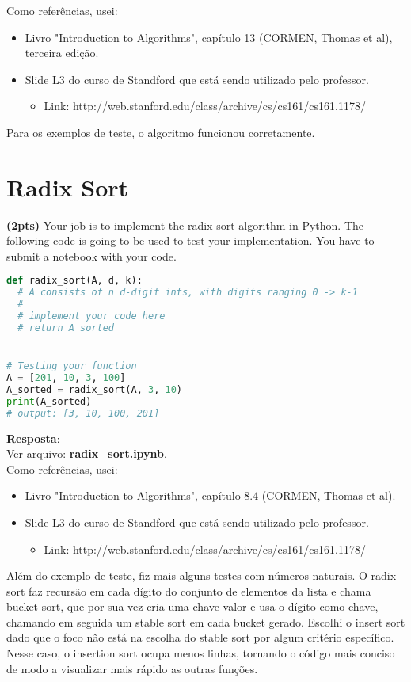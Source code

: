 \documentclass{article}
\begin{document}
Como referências, usei:
\begin{itemize}
	\item Livro "Introduction to Algorithms", capítulo 13 (CORMEN, Thomas et al), terceira edição.
	\item Slide L3 do curso de Standford que está sendo utilizado pelo professor. 
	\begin{itemize}
		\item Link: http://web.stanford.edu/class/archive/cs/cs161/cs161.1178/
	\end{itemize}
\end{itemize}

Para os exemplos de teste, o algoritmo funcionou corretamente.

\section{Radix Sort}

\textbf{(2pts) }Your job is to implement the radix sort algorithm in Python. The following code is going to be used to test your implementation. You have to submit a notebook with your code. 
  
\begin{lstlisting}[language=Python]
def radix_sort(A, d, k):
  # A consists of n d-digit ints, with digits ranging 0 -> k-1
  #
  # implement your code here
  # return A_sorted


# Testing your function
A = [201, 10, 3, 100]
A_sorted = radix_sort(A, 3, 10)
print(A_sorted)
# output: [3, 10, 100, 201]
\end{lstlisting}

\textbf{Resposta}:\\

Ver arquivo: \textbf{radix\_sort.ipynb}.\\

Como referências, usei:
\begin{itemize}
	\item Livro "Introduction to Algorithms", capítulo 8.4 (CORMEN, Thomas et al).
	\item Slide L3 do curso de Standford que está sendo utilizado pelo professor. 
	\begin{itemize}
		\item Link: http://web.stanford.edu/class/archive/cs/cs161/cs161.1178/
	\end{itemize}
\end{itemize}
  
 
Além do exemplo de teste, fiz mais alguns testes com números naturais. O radix sort faz  recursão em cada dígito do conjunto de elementos da lista e chama bucket sort, que por sua vez cria uma chave-valor e usa o dígito como chave, chamando em seguida um stable sort em cada bucket gerado. Escolhi o insert sort dado que o foco não está na escolha do stable sort por algum critério específico. Nesse caso, o insertion sort ocupa menos linhas, tornando o código mais conciso de modo a visualizar mais rápido as outras funções.
\end{document}
